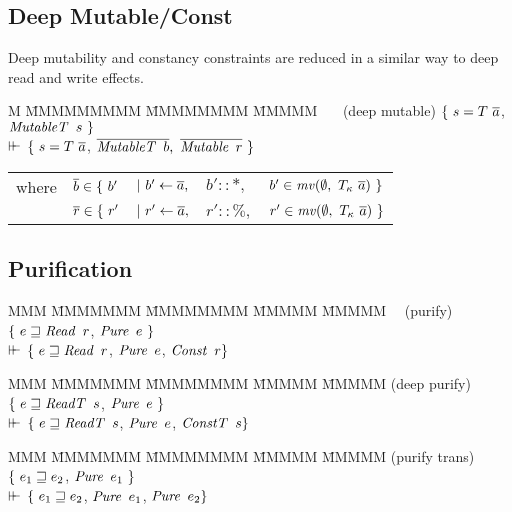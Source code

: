 \subsection{Deep Mutable/Const}

Deep mutability and constancy constraints are reduced in a similar way to deep read and write effects.

\begin{tabbing}
	M \= MMMMMMMMM \= MMMMMMMM \= MMMMM \kill
	\> \ \ \ (deep mutable)	\> $\{ \ s = T \ \overline{a}$, 
				\> $\operatorname{\mathit{MutableT}} \ s \ \}$ 
	\\
	\> \qq \qq $\vdash\mkern-6mu\vdash$	\> $\{ \ s = T \ \overline{a}$, 
				\> $\ov{\iMutableT \ b}, \ \ov{\iMutable \ r} \ \}$ 
	\\[1ex]
	\>  \qq \qq	
		\begin{tabular}{lllll}
		where 	& $\ov{b} \in \{ \ b'$	
					& $| \ b'  \gets \overline{a},$
					& $b' :: *,$
					& $b' \in \operatorname{\mathit{mv}}(\emptyset, \ T_{\kappa} \ \overline{a}) \ \}$ \\
			& $\overline{r}    \in \{ \  r'$	
					& $| \ r'   \gets \overline{a},$
					& $r' :: \%,$ 
					& $r' \in \operatorname{\mathit{mv}}(\emptyset, \ T_{\kappa} \ \overline{a}) \ \}$ 
		\end{tabular}
\end{tabbing}


\subsection{Purification}

\begin{tabbing}
	MMM \= MMMMMMM \= MMMMMMMM \= MMMMM \= MMMMM \kill
	\> \ \ (purify)	\> $\{ \ e \sqsupseteq \operatorname{\mathit{Read}} \ r$, 
			\> $\operatorname{\mathit{Pure}} \ e \ \}$ 
	\\
	\> \qq $\vdash\mkern-6mu\vdash$	
			\> $\{ \ e \sqsupseteq \operatorname{\mathit{Read}} \ r$, 
			\> $\iPure \ e$,
			\> $\operatorname{\mathit{Const}} \ r \}$ 
\end{tabbing}

\begin{tabbing}
	MMM \= MMMMMMM \= MMMMMMMM \= MMMMM \= MMMMM \kill
	\> (deep purify)	
			\> $\{ \ e \sqsupseteq \operatorname{\mathit{ReadT}} \ s$, 
			\> $\operatorname{\mathit{Pure}} \ e \ \}$ 
	\\
	\> \qq $\vdash\mkern-6mu\vdash$	
			\> $\{ \ e \sqsupseteq \operatorname{\mathit{ReadT}} \ s$, 
			\> $\iPure \ e$,
			\> $\operatorname{\mathit{ConstT}} \ s \}$ 
\end{tabbing}

\begin{tabbing}
	MMM \= MMMMMMM \= MMMMMMMM \= MMMMM \= MMMMM \kill
	\> (purify trans)	
			\> $\{ \ e_1 \sqsupseteq e_2$, 
			\> $\operatorname{\mathit{Pure}} \ e_1 \ \}$ 
	\\
	\> \qq $\vdash\mkern-6mu\vdash$	
			\> $\{ \ e_1 \sqsupseteq e_2$, 
			\> $\operatorname{\mathit{Pure}} \ e_1$,
			\> $\operatorname{\mathit{Pure}} \ e_2 \}$ 
\end{tabbing}


